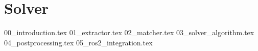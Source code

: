 \section{Solver}

{00_introduction.tex}
{01_extractor.tex}
{02_matcher.tex}
{03_solver_algorithm.tex}
{04_postprocessing.tex}
{05_ros2_integration.tex}
